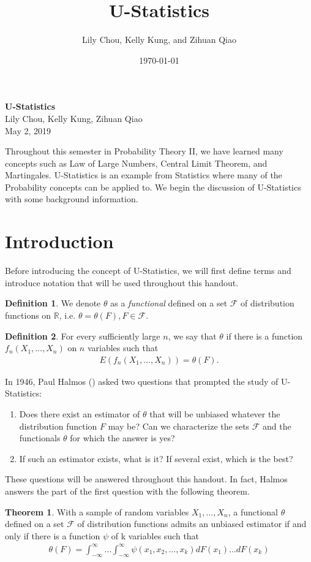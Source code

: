 \documentclass{article}
\title{U-Statistics}
\author{Lily Chou, Kelly Kung, and Zihuan Qiao}
\date{\today}
\newcommand{\R}{{\mathbb{R}}}
\theoremstyle{definition}
\newtheorem{theorem}{Theorem}
\newtheorem{Def}{Definition}
\numberwithin{Def}{section}
\begin{document}
\thispagestyle{empty}

\begin{center}
{\LARGE \bf U-Statistics}\\
{\large Lily Chou, Kelly Kung, Zihuan Qiao}\\
May 2, 2019
\end{center}

Throughout this semester in Probability Theory II, we have learned many concepts such as Law of Large Numbers, Central Limit Theorem, and Martingales. U-Statistics is an example from Statistics where many of the Probability concepts can be applied to. We begin the discussion of U-Statistics with some background information.

\section{Introduction}
Before introducing the concept of U-Statistics, we will first define terms and introduce notation that will be used throughout this handout. 
\begin{Def}{}
We denote $\theta$ as a \textit{functional} defined on a set $\mathcal{F}$ of distribution functions on $\R$, i.e. $\theta = \theta(F), F \in \mathcal{F}$.
\end{Def}

\begin{Def}{}
For every sufficiently large $n$, we say that $\theta$  if there is a function $f_n(X_1, \dotsc, X_n)$ on $n$ variables such that \begin{align}\label{unbiased} E(f_n(X_1, \dotsc, X_n)) = \theta(F).\end{align}
\end{Def}

In 1946, Paul Halmos (\cite{halmos1946theory,}) asked two questions that prompted the study of U-Statistics:
\begin{enumerate}
    \item Does there exist an estimator of $\theta$ that will be unbiased whatever the distribution function $F$ may be? Can we characterize the sets $\mathcal{F}$ and the functionals $\theta$ for which the answer is yes?
    \item If such an estimator exists, what is it? If several exist, which is the best?
\end{enumerate}

These questions will be answered throughout this handout. In fact, Halmos answers the part of the first question with the following theorem. 
\begin{theorem}
With a sample of random variables $X_1, \dotsc, X_n$, a functional $\theta$ defined on a set $\mathcal{F}$ of distribution functions admits an unbiased estimator if and only if there is a function $\psi$ of k variables such that 
\begin{align}\label{unbiased_est}
    \theta(F) = \int_{-\infty}^{\infty} \dotsc \int_{-\infty}^{\infty} \psi(x_1, x_2, \dotsc, x_k)dF(x_1) \dotsc dF(x_k)
\end{align}
\end{theorem}
\end{document}
